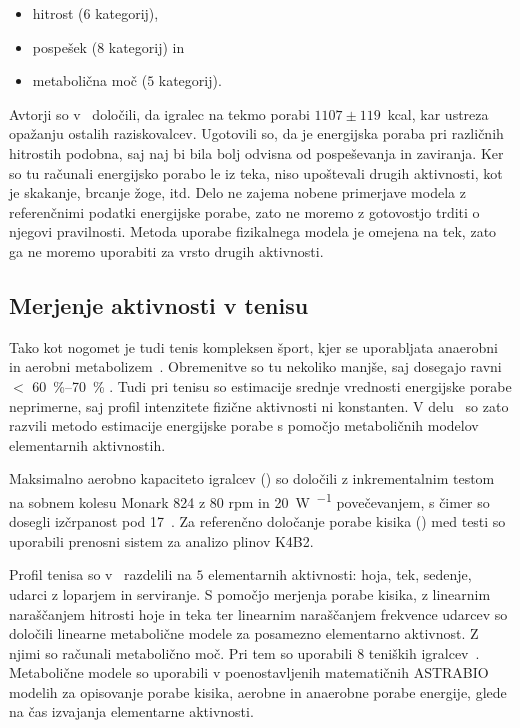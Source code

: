 \begin{itemize}
\item hitrost ($6$ kategorij),
\item pospešek ($8$ kategorij) in
\item metabolična moč ($5$ kategorij).
\end{itemize}

Avtorji so v~\cite{osgnach2010energy} določili, da igralec na tekmo porabi $1107 \pm 119$~kcal, kar ustreza opažanju ostalih raziskovalcev. Ugotovili so, da je energijska poraba pri različnih hitrostih podobna, saj naj bi bila bolj odvisna od pospeševanja in zaviranja. Ker so tu računali energijsko porabo le iz teka, niso upoštevali drugih aktivnosti, kot je skakanje, brcanje žoge, itd. Delo ne zajema nobene primerjave modela z referenčnimi podatki energijske porabe, zato ne moremo z gotovostjo trditi o njegovi pravilnosti. Metoda uporabe fizikalnega modela je omejena na tek, zato ga ne moremo uporabiti za vrsto drugih aktivnosti.





\subsection{Merjenje aktivnosti v tenisu}

Tako kot nogomet je tudi tenis kompleksen šport, kjer se uporabljata anaerobni in aerobni metabolizem~\cite{botton2011energy}. Obremenitve so tu nekoliko manjše, saj dosegajo ravni $<$ \SIrange{60}{70}{\%} \vomax. Tudi pri tenisu so estimacije srednje vrednosti energijske porabe neprimerne, saj profil intenzitete fizične aktivnosti ni konstanten. V delu~\cite{botton2011energy} so zato razvili metodo estimacije energijske porabe s pomočjo metaboličnih modelov elementarnih aktivnostih. 

Maksimalno aerobno kapaciteto igralcev (\vomax) so določili z inkrementalnim testom na sobnem kolesu Monark 824 z 80 rpm in \SI{20}{W.\min^{-1}} povečevanjem, s čimer so dosegli izčrpanost pod \SI{17}{\min}~\cite{botton2011energy}. Za referenčno določanje porabe kisika (\vo) med testi so uporabili prenosni sistem za analizo plinov K4B2. 

Profil tenisa so v~\cite{botton2011energy} razdelili na $5$ elementarnih aktivnosti: hoja, tek, sedenje, udarci z loparjem in serviranje. S pomočjo merjenja porabe kisika, z linearnim naraščanjem hitrosti hoje in teka ter linearnim naraščanjem frekvence udarcev so določili linearne metabolične modele za posamezno elementarno aktivnost. Z njimi so računali metabolično moč. Pri tem so uporabili $8$ teniških igralcev~\cite{botton2011energy}. Metabolične modele so uporabili v poenostavljenih matematičnih ASTRABIO modelih za opisovanje porabe kisika, aerobne in anaerobne porabe energije, glede na čas izvajanja elementarne aktivnosti. 

